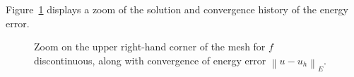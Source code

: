 \documentclass[final,leqno]{siamltex}
\newcommand{\nor}[1]{\left\| #1 \right\|}
\begin{document}
Figure~\ref{fig:discForcing2} displays a zoom of the solution and convergence history of the energy error.
\begin{figure}[!h]
\centering
{}
\caption{Zoom on the upper right-hand corner of the mesh for $f$ discontinuous, along with convergence of energy error $\nor{u-u_h}_E$.}
\label{fig:discForcing2}
\end{figure}
\end{document}
